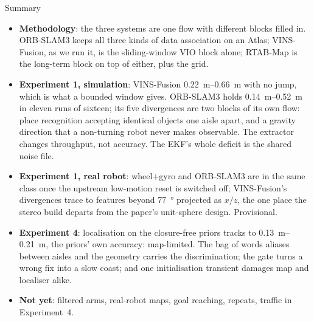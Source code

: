 \documentclass[11pt,aspectratio=169]{beamer}
\begin{document}
\begin{frame}{Summary}
  \scriptsize
  \begin{itemize}
    \item \textbf{Methodology}: the three systems are one flow with different
          blocks filled in. ORB-SLAM3 keeps all three kinds of data association
          on an Atlas; VINS-Fusion, as we run it, is the sliding-window VIO block
          alone; RTAB-Map is the long-term block on top of either, plus the grid.
    \item \textbf{Experiment 1, simulation}: VINS-Fusion \SIrange{0.22}{0.66}{\metre}
          with no jump, which is what a bounded window gives. ORB-SLAM3 holds
          \SIrange{0.14}{0.52}{\metre} in eleven runs of sixteen; its five
          divergences are two blocks of its own flow: place recognition
          accepting identical objects one aisle apart, and a gravity direction
          that a non-turning robot never makes observable. The extractor changes
          throughput, not accuracy. The EKF's whole deficit is the shared
          noise file.
    \item \textbf{Experiment 1, real robot}: wheel$+$gyro and ORB-SLAM3 are in
          the same class once the upstream low-motion reset is switched off;
          VINS-Fusion's divergences trace to features beyond \SI{77}{\degree}
          projected as $x/z$, the one place the stereo build departs from the
          paper's unit-sphere design. Provisional.
    \item \textbf{Experiment 4}: localisation on the closure-free priors tracks
          to \SIrange{0.13}{0.21}{\metre}, the priors' own accuracy:
          map-limited. The bag of words aliases between aisles and the
          geometry carries the discrimination; the gate turns a wrong fix into
          a slow coast; and one initialisation transient damages map and
          localiser alike.
    \item \textbf{Not yet}: filtered arms, real-robot maps, goal reaching,
          repeats, traffic in Experiment~4.
  \end{itemize}
\end{frame}
\end{document}
